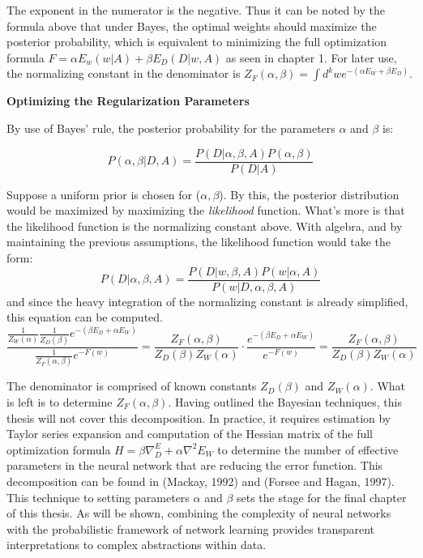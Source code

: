 The exponent in the numerator is the negative.  Thus it can be noted by the formula above that under Bayes, the optimal weights should maximize the posterior probability, which is equivalent to minimizing the full optimization formula $F = \alpha E_w(w|A) + \beta E_D(D|w,A)$ as seen in chapter 1.  For later use, the normalizing constant in the denominator is $Z_F(\alpha,\beta) = \int d^k w e^{-(\alpha E_W + \beta E_D)}$.


\textbf{Optimizing the Regularization Parameters}

By use of Bayes' rule, the posterior probability for the parameters $\alpha$ and $\beta$ is:

$$
P(\alpha, \beta | D,A) = \frac{P(D|\alpha,\beta,A) P(\alpha,\beta)}{P(D|A)}
$$



Suppose a uniform prior is chosen for ($\alpha,\beta$).  By this, the posterior distribution would be maximized by maximizing the \textit{likelihood} function.  What's more is that the likelihood function is the normalizing constant above.  With algebra, and by maintaining the previous assumptions, the likelihood function would take the form:
$$
P(D|\alpha,\beta,A) = \frac{P(D|w,\beta,A) P(w|\alpha,A)}{P(w|D,\alpha,\beta,A)}
$$
and since the heavy integration of the normalizing constant is already simplified, this equation can be computed.
$$
\frac{\frac{1}{Z_W(\alpha)} \frac{1}{Z_D(\beta)} e^{-(\beta E_D + \alpha E_W)}}{\frac{1}{Z_F(\alpha,\beta)} e^{-F(w)}} = \frac{Z_F(\alpha,\beta)}{Z_D(\beta) Z_W(\alpha)} \cdot \frac{e^{-(\beta E_D + \alpha E_W)}}{e^{-F(w)}} = \frac{Z_F(\alpha,\beta)}{Z_D(\beta) Z_W(\alpha)}
$$

The denominator is comprised of known constants $Z_D(\beta)$ and $Z_W(\alpha)$.  What is left is to determine $Z_F(\alpha,\beta)$.  Having outlined the Bayesian techniques, this thesis will not cover this decomposition.  In practice, it requires estimation by Taylor series expansion and computation of the Hessian matrix of the full optimization formula $H = \beta \nabla^ E_D + \alpha \nabla^2 E_W$ to determine the number of effective parameters in the neural network that are reducing the error function.  This decomposition can be found in (Mackay, 1992) and (Forsee and Hagan, 1997).  This technique to setting parameters $\alpha$ and $\beta$ sets the stage for the final chapter of this thesis. As will be shown, combining the complexity of neural networks with the probabilistic framework of network learning provides transparent interpretations to complex abstractions within data.


\begin{comment}
Through \textbf{margialization}, the true posterior $P(w|D,A)$ is obtained by integrating out $\alpha$ and $\beta$:
$$
P(w|D,A) = \int P(w|D,\alpha,\beta,A) P(\alpha, \beta | D,A) \text{ } d\alpha \text{ } d\beta
$$
\end{comment}
